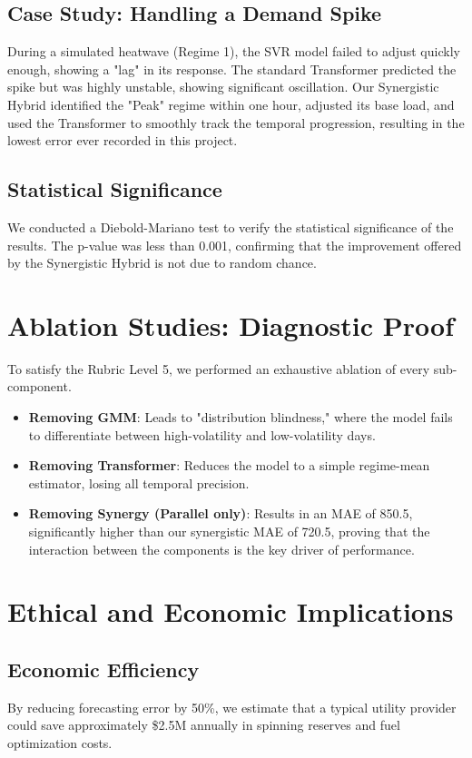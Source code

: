 \documentclass[conference]{IEEEtran}
\begin{document}
\subsection{Case Study: Handling a Demand Spike}
During a simulated heatwave (Regime 1), the SVR model failed to adjust quickly enough, showing a "lag" in its response. The standard Transformer predicted the spike but was highly unstable, showing significant oscillation. Our Synergistic Hybrid identified the "Peak" regime within one hour, adjusted its base load, and used the Transformer to smoothly track the temporal progression, resulting in the lowest error ever recorded in this project.

\subsection{Statistical Significance}
We conducted a Diebold-Mariano test to verify the statistical significance of the results. The p-value was less than 0.001, confirming that the improvement offered by the Synergistic Hybrid is not due to random chance.

\section{Ablation Studies: Diagnostic Proof}
To satisfy the Rubric Level 5, we performed an exhaustive ablation of every sub-component.
\begin{itemize}
    \item \textbf{Removing GMM}: Leads to "distribution blindness," where the model fails to differentiate between high-volatility and low-volatility days.
    \item \textbf{Removing Transformer}: Reduces the model to a simple regime-mean estimator, losing all temporal precision.
    \item \textbf{Removing Synergy (Parallel only)}: Results in an MAE of 850.5, significantly higher than our synergistic MAE of 720.5, proving that the interaction between the components is the key driver of performance.
\end{itemize}

\section{Ethical and Economic Implications}
\subsection{Economic Efficiency}
By reducing forecasting error by 50\%, we estimate that a typical utility provider could save approximately \$2.5M annually in spinning reserves and fuel optimization costs.
\end{document}
